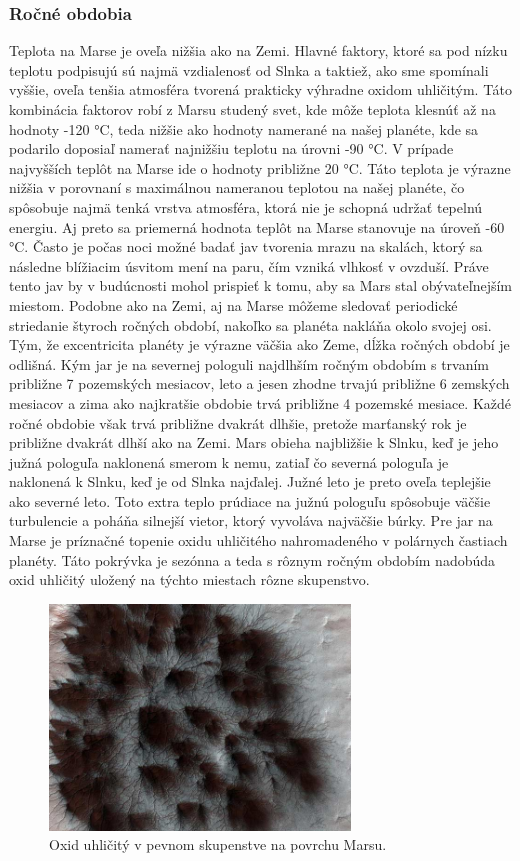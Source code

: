 \subsubsection{Ročné obdobia}
Teplota na Marse je oveľa nižšia ako na Zemi. Hlavné faktory, ktoré sa pod nízku teplotu podpisujú sú najmä vzdialenosť od Slnka a taktiež, ako sme spomínali vyššie, oveľa tenšia atmosféra tvorená prakticky výhradne oxidom uhličitým. Táto kombinácia faktorov robí z Marsu studený svet, kde môže teplota klesnúť až na hodnoty -120 °C, teda nižšie ako hodnoty namerané na našej planéte, kde sa podarilo doposiaľ namerať najnižšiu teplotu na úrovni -90 °C. V prípade najvyšších teplôt na Marse ide o hodnoty približne 20 °C. Táto teplota je výrazne nižšia v porovnaní s maximálnou nameranou teplotou na našej planéte, čo spôsobuje najmä tenká vrstva atmosféra, ktorá nie je schopná udržať tepelnú energiu. Aj preto sa priemerná hodnota teplôt na Marse stanovuje na úroveň -60 °C. Často je počas noci možné badať jav tvorenia mrazu na skalách, ktorý sa následne blížiacim úsvitom mení na paru, čím vzniká vlhkosť v ovzduší. Práve tento jav by v budúcnosti mohol prispieť k tomu, aby sa Mars stal obývateľnejším miestom. 
Podobne ako na Zemi, aj na Marse môžeme sledovať periodické striedanie štyroch ročných období, nakoľko sa planéta nakláňa okolo svojej osi. Tým, že excentricita planéty je výrazne väčšia ako Zeme, dĺžka ročných období je odlišná. Kým jar je na severnej pologuli najdlhším ročným obdobím s trvaním približne 7 pozemských mesiacov, leto a jesen zhodne trvajú približne 6 zemských mesiacov a zima ako najkratšie obdobie trvá približne 4 pozemské mesiace.
Každé ročné obdobie však trvá približne dvakrát dlhšie, pretože marťanský rok je približne dvakrát dlhší ako na Zemi. Mars obieha najbližšie k Slnku, keď je jeho južná pologuľa naklonená smerom k nemu, zatiaľ čo severná pologuľa je naklonená k Slnku, keď je od Slnka najďalej. Južné leto je preto oveľa teplejšie ako severné leto. Toto extra teplo prúdiace na južnú pologuľu spôsobuje väčšie turbulencie a poháňa silnejší vietor, ktorý vyvoláva najväčšie búrky. 
Pre jar na Marse je príznačné topenie oxidu uhličitého nahromadeného v polárnych častiach planéty. Táto pokrývka je sezónna a teda s rôznym ročným obdobím nadobúda oxid uhličitý uložený na týchto miestach rôzne skupenstvo.
\begin{figure}[!htbp]
  \centering
  \includegraphics[width=8cm]{img/co2.jpg}
  \caption{Oxid uhličitý v pevnom skupenstve na povrchu Marsu.}
  \label{co2}
\end{figure}
